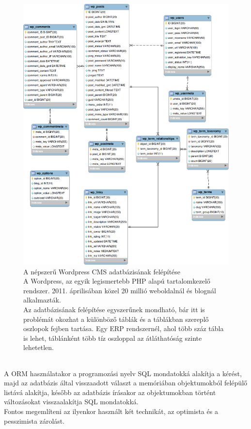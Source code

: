 \begin{figure}[h]
	
	\begin{minipage}{\textwidth}
		\begin{center}
			\includegraphics[scale=0.50]{pictures/wordpress_db_struct.png} %
		\end{center}
		\caption[DUMMY CAPTION]%
		{A népszerű Wordpress CMS adatbázisának felépítése
		\hfill\\
A Wordpress, az egyik legismertebb PHP alapú tartalomkezelő rendszer. 2011. áprilisában közel 20 millió weboldalnál és blognál alkalmazták.\\
Az adatbázisának felépítése egyszerűnek mondható, bár itt is problémát okozhat a különböző táblák és a táblákban szereplő oszlopok fejben tartása. Egy ERP rendszernél, ahol több száz tábla is lehet, táblánként több tíz oszloppal az átláthatóság szinte lehetetlen.\\
		}
	\end{minipage}
\label{fig:wpdbstruct_o}
\end{figure}
\clearpage
\hfill\\
A ORM használatakor a programozási nyelv SQL mondatokká alakítja a kérést, majd az adatbázis által visszaadott választ a memóriában objektumokból felépülő listává alakítja, később az adatbázis írásakor az objektumokban történt változásokat visszaalakítja SQL mondatokká.\\
Fontos megemlíteni az ilyenkor használt két technikát, az optimista és a pesszimista zárolást.

